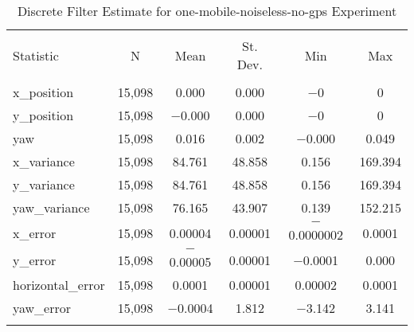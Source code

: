 
\begin{table}[h] \centering 
  \caption{Discrete Filter Estimate for one-mobile-noiseless-no-gps Experiment} 
  \label{tab:one_mobile_noiseless_no_gps_discrete_summary} 
\begin{tabular}{@{\extracolsep{5pt}}lccccc} 
\\[-1.8ex]\hline 
\hline \\[-1.8ex] 
Statistic & \multicolumn{1}{c}{N} & \multicolumn{1}{c}{Mean} & \multicolumn{1}{c}{St. Dev.} & \multicolumn{1}{c}{Min} & \multicolumn{1}{c}{Max} \\ 
\hline \\[-1.8ex] 
x\_position & 15,098 & 0.000 & 0.000 & $-$0 & 0 \\ 
y\_position & 15,098 & $-$0.000 & 0.000 & $-$0 & 0 \\ 
yaw & 15,098 & 0.016 & 0.002 & $-$0.000 & 0.049 \\ 
x\_variance & 15,098 & 84.761 & 48.858 & 0.156 & 169.394 \\ 
y\_variance & 15,098 & 84.761 & 48.858 & 0.156 & 169.394 \\ 
yaw\_variance & 15,098 & 76.165 & 43.907 & 0.139 & 152.215 \\ 
x\_error & 15,098 & 0.00004 & 0.00001 & $-$0.0000002 & 0.0001 \\ 
y\_error & 15,098 & $-$0.00005 & 0.00001 & $-$0.0001 & 0.000 \\ 
horizontal\_error & 15,098 & 0.0001 & 0.00001 & 0.00002 & 0.0001 \\ 
yaw\_error & 15,098 & $-$0.0004 & 1.812 & $-$3.142 & 3.141 \\ 
\hline \\[-1.8ex] 
\end{tabular} 
\end{table} 
